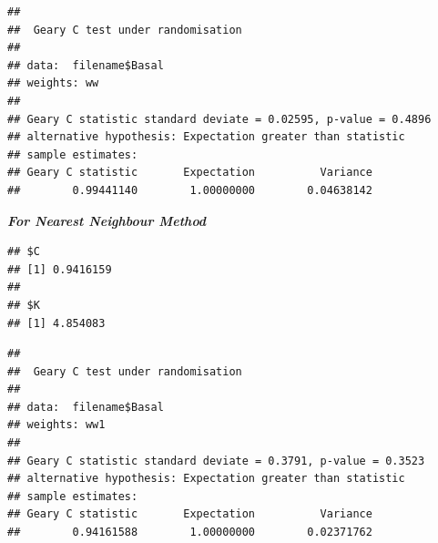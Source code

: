 \documentclass[
]{book}
\newenvironment{Shaded}{\begin{snugshade}}{\end{snugshade}}
\newcommand{\AttributeTok}[1]{\textcolor[rgb]{0.13,0.29,0.53}{#1}}
\newcommand{\DecValTok}[1]{\textcolor[rgb]{0.00,0.00,0.81}{#1}}
\newcommand{\DocumentationTok}[1]{\textcolor[rgb]{0.56,0.35,0.01}{\textbf{\textit{#1}}}}
\newcommand{\FunctionTok}[1]{\textcolor[rgb]{0.13,0.29,0.53}{\textbf{#1}}}
\newcommand{\NormalTok}[1]{#1}
\newcommand{\SpecialCharTok}[1]{\textcolor[rgb]{0.81,0.36,0.00}{\textbf{#1}}}
\begin{document}
\begin{Shaded}
\end{Shaded}

\begin{verbatim}
## 
##  Geary C test under randomisation
## 
## data:  filename$Basal 
## weights: ww 
## 
## Geary C statistic standard deviate = 0.02595, p-value = 0.4896
## alternative hypothesis: Expectation greater than statistic
## sample estimates:
## Geary C statistic       Expectation          Variance 
##        0.99441140        1.00000000        0.04638142
\end{verbatim}

\textbf{\emph{For Nearest Neighbour Method}}

\begin{Shaded}
\end{Shaded}

\begin{verbatim}
## $C
## [1] 0.9416159
## 
## $K
## [1] 4.854083
\end{verbatim}

\begin{Shaded}
\end{Shaded}

\begin{verbatim}
## 
##  Geary C test under randomisation
## 
## data:  filename$Basal 
## weights: ww1 
## 
## Geary C statistic standard deviate = 0.3791, p-value = 0.3523
## alternative hypothesis: Expectation greater than statistic
## sample estimates:
## Geary C statistic       Expectation          Variance 
##        0.94161588        1.00000000        0.02371762
\end{verbatim}
\end{document}
